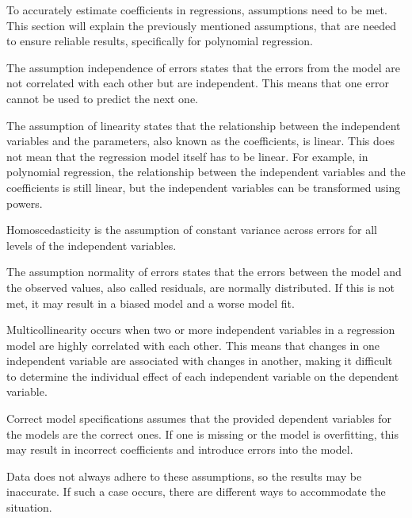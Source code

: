 To accurately estimate coefficients in regressions, assumptions need to be met. This section will explain the previously mentioned assumptions, that are needed to ensure reliable results, specifically for polynomial regression.
\newline 

The assumption independence of errors states that the errors from the model are not correlated with each other but are independent. This means that one error cannot be used to predict the next one. \newline


 The assumption of linearity states that the relationship between the independent variables and the parameters, also known as the coefficients, is linear. This does not mean that the regression model itself has to be linear. For example, in polynomial regression, the relationship between the independent variables and the coefficients is still linear, but the independent variables can be transformed using powers.\newline


Homoscedasticity is the assumption of constant variance across errors for all levels of the independent variables. \newline

The assumption normality of errors states that the errors between the model and the observed values, also called residuals, are normally distributed. If this is not met, it may result in a biased model and a worse model fit. \newline


Multicollinearity occurs when two or more independent variables in a regression model are highly correlated with each other. This means that changes in one independent variable are associated with changes in another, making it difficult to determine the individual effect of each independent variable on the dependent variable. \newline

Correct model specifications assumes that the provided dependent variables for the models are the correct ones. If one is missing or the model is overfitting, this may result in incorrect coefficients and introduce errors into the model. \newline

Data does not always adhere to these assumptions, so the results may be inaccurate. 
If such a case occurs, there are different ways to accommodate the situation.  


